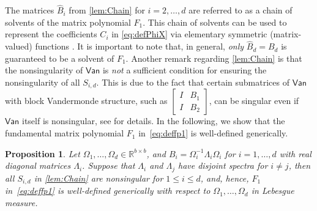 \documentclass{article}
\newtheorem{proposition}{Proposition}%
\newcommand{\van}{\mathsf{Van}}
\newcommand{\fp}{F}
\newcommand{\R}{\mathbb{R}}
\begin{document}
The matrices $\widehat{B}_{i}$ from \cref{lem:Chain} for $i=2,\dotsc,d$ are referred to as a chain of solvents \cite[Def.~4.1]{Dennis1976} of the matrix polynomial $\fp_{1}$. This chain of  solvents can be used to represent the coefficients $C_{i}$ in \cref{eq:defPhiX} via elementary symmetric (matrix-valued) functions \cite[Thm.~4.6]{Dennis1976}.
It is important to note that, in general, \emph{only} $\widehat{B}_{d}=B_{d}$  is guaranteed to be a solvent of $\fp_{1}$.
Another remark regarding \cref{lem:Chain} is that the nonsingularity of $\van$ is \emph{not} a sufficient condition for ensuring the nonsingularity of all $S_{i,d}$. This is due to the fact that certain submatrices of $\van$ with block Vandermonde structure, such as $\begin{bmatrix}
    I & B_{1}\\ I & B_{2}
\end{bmatrix}$, can be singular even if $\van$ itself is nonsingular, see \cite[p.~841]{Dennis1976} for details. 
In the following, we show that the fundamental matrix polynomial $\fp_{1}$ in~\cref{eq:deffp1} is well-defined generically.
\begin{proposition}
    \label{prop:wellpose}
    Let $\Omega_{1},\dotsc,\Omega_{d}\in\R^{b\times b}$, and $B_{i}=\Omega_{i}^{-1}\Lambda_{i}\Omega_{i}$ for $i=1,\dotsc,d$ with real diagonal matrices $\Lambda_{i}$. Suppose that $\Lambda_{i}$ and $\Lambda_{j}$ have disjoint spectra for $i\neq j$, then all $S_{i,d}$ in \cref{lem:Chain} are nonsingular for $1\leq i\leq d$, and, hence, $\fp_{1}$ in~\cref{eq:deffp1} is well-defined generically with respect to $\Omega_{1},\dotsc,\Omega_{d}$ in Lebesgue measure. 
\end{proposition}
\end{document}
